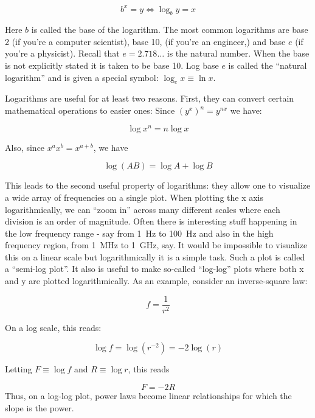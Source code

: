 \documentclass{tufte-book}
\begin{document}
\begin{equation}\label{eq:deflog}
b^x = y \Leftrightarrow \log_by = x
\end{equation}

\noindent Here $b$ is called the base of the logarithm. The most common logarithms are base 2 (if you're a computer scientist), base 10, (if you're an engineer,) and base $e$ (if you're a physicist). Recall that $e = 2.718\ldots$ is the natural number. When the base is not explicitly stated it is taken to be base 10. Log base $e$ is called the ``natural logarithm'' and is given a special symbol: $\log_ex\equiv \ln x$. 

Logarithms are useful for at least two reasons. First, they can convert certain mathematical operations to easier ones: Since $\left(y^x\right)^n = y^{nx}$ we have:

\begin{equation}\label{eq:logexp}
\log x^n = n\log x
\end{equation}

\noindent Also, since $ x^ax^b = x^{a+b}$, we have

\begin{equation}\label{eq:logmult}
\log\left(AB\right) = \log A  + \log B
\end{equation}

This leads to the second useful property of logarithms: they allow one to visualize a wide array of frequencies on a single plot. When plotting the x axis logarithmically, we can ``zoom in'' across many different scales where each division is an order of magnitude. Often there is interesting stuff happening in the low frequency range - say from 1~Hz to 100~Hz and also in the high frequency region, from 1~MHz to 1~GHz, say. It would be impossible to visualize this on a linear scale but logarithmically it is a simple task. Such a plot is called a ``semi-log plot''. It also is useful to make so-called ``log-log'' plots where both x and y are plotted logarithmically. As an example, consider an inverse-square law:

$$
f = \frac{1}{r^2}
$$

On a log scale, this reads:

$$
\log f = \log(r^{-2}) = -2\log(r)
$$

\noindent Letting $F\equiv\log f$ and $R\equiv\log{r}$, this reads

$$
F = -2R
$$
\noindent Thus, on a log-log plot, power laws become linear relationships for which the slope is the power.
\end{document}
